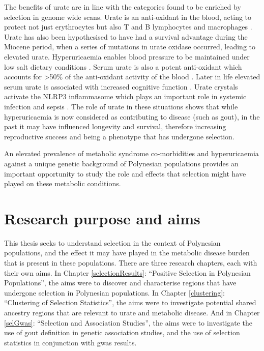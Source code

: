 \documentclass[twoside,openright]{report}
\begin{document}
The benefits of urate are in line with the categories found to be
enriched by selection in genome wide scans. Urate is an anti-oxidant in
the blood, acting to protect not just erythrocytes but also T and B
lymphocytes and macrophages \citep{Ames1981}. Urate has also been
hypothesised to have had a survival advantage during the Miocene period,
when a series of mutations in urate oxidase occurred, leading to
elevated urate. Hyperuricaemia enables blood pressure to be maintained
under low salt dietary conditions \citep{Watanabe2002}. Serum urate is
also a potent anti-oxidant which accounts for \textgreater{}50\% of the
anti-oxidant activity of the blood \citep{Glantzounis2005, Parmar2009}.
Later in life elevated serum urate is associated with increased
cognitive function \citep{Euser2009}. Urate crystals activate the NLRP3
inflammasome which plays an important role in systemic infection and
sepsis \citep{Opitz2009}. The role of urate in these situations shows
that while hyperuricaemia is now considered as contributing to disease
(such as gout), in the past it may have influenced longevity and
survival, therefore increasing reproductive success and being a
phenotype that has undergone selection.

An elevated prevalence of metabolic syndrome co-morbidities and
hyperuricaemia against a unique genetic background of Polynesian
populations provides an important opportunity to study the role and
effects that selection might have played on these metabolic conditions.

\section{Research purpose and aims}\label{research-purpose-and-aims}

This thesis seeks to understand selection in the context of Polynesian
populations, and the effect it may have played in the metabolic disease
burden that is present in these populations. There are three research
chapters, each with their own aims. In Chapter \ref{selectionResults}:
``Positive Selection in Polynesian Populations'', the aims were to
discover and characterise regions that have undergone selection in
Polynesian populations. In Chapter \ref{clustering}: ``Clustering of
Selection Statistics'', the aims were to investigate potential shared
ancestry regions that are relevant to urate and metabolic disease. And
in Chapter \ref{selGwas}: ``Selection and Association Studies'', the
aims were to investigate the use of gout definition in genetic
association studies, and the use of selection statistics in conjunction
with \gls{gwas} results.
\end{document}
